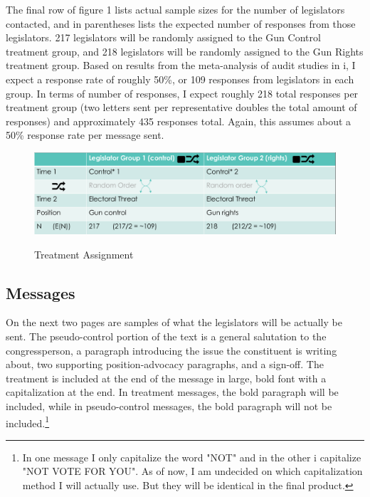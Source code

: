 \documentclass[12pt]{article}
\begin{document}
The final row of figure 1 lists actual sample sizes for the number of legislators contacted, and in parentheses lists the expected number of responses from those legislators. 217 legislators will be randomly assigned to the Gun Control treatment group, and 218 legislators will be randomly assigned to the Gun Rights treatment group. Based on results from the meta-analysis of audit studies in i\cite{Costa:2017aa}, I expect a response rate of roughly 50\%, or 109 responses from legislators in each group. In terms of number of responses, I expect roughly 218 total responses per treatment group (two letters sent per representative doubles the total amount of responses) and approximately 435 responses total. Again, this assumes about a 50\% response rate per message sent.\\

\begin{figure}[h!]
	\caption{Treatment Assignment}
	\includegraphics[width=\textwidth]{design_chart.png}\\
\end{figure}

\subsection{Messages}
On the next two pages are samples of what the legislators will be actually be sent. The pseudo-control portion of the text is a general salutation to the congressperson, a paragraph introducing the issue the constituent is writing about, two supporting position-advocacy paragraphs, and a sign-off. The treatment is included at the end of the message in large, bold font with a capitalization at the end. In treatment messages, the bold paragraph will be included, while in pseudo-control messages, the bold paragraph will not be included.\footnote{In one message I only capitalize the word "NOT" and in the other i capitalize "NOT VOTE FOR YOU". As of now, I am undecided on which capitalization method I will actually use. But they will be identical in the final product.}
\end{document}
